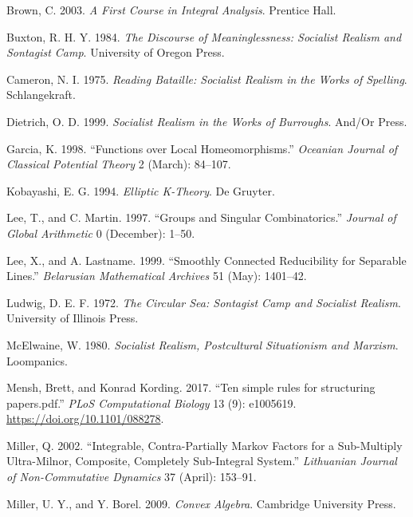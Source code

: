 \documentclass[12pt,english,a4paper,oneside,]{book} %
\theoremstyle{definition}
\theoremstyle{definition}
\theoremstyle{definition}
\theoremstyle{remark}
\begin{document}
\leavevmode\hypertarget{ref-cite:2}{}%
Brown, C. 2003. \emph{A First Course in Integral Analysis}. Prentice Hall.

\leavevmode\hypertarget{ref-Buxton1984}{}%
Buxton, R. H. Y. 1984. \emph{The Discourse of Meaninglessness: Socialist Realism and Sontagist Camp}. University of Oregon Press.

\leavevmode\hypertarget{ref-Cameron1975}{}%
Cameron, N. I. 1975. \emph{Reading Bataille: Socialist Realism in the Works of Spelling}. Schlangekraft.

\leavevmode\hypertarget{ref-Dietrich1999}{}%
Dietrich, O. D. 1999. \emph{Socialist Realism in the Works of Burroughs}. And/Or Press.

\leavevmode\hypertarget{ref-cite:17}{}%
Garcia, K. 1998. ``Functions over Local Homeomorphisms.'' \emph{Oceanian Journal of Classical Potential Theory} 2 (March): 84--107.

\leavevmode\hypertarget{ref-cite:10}{}%
Kobayashi, E. G. 1994. \emph{Elliptic K-Theory}. De Gruyter.

\leavevmode\hypertarget{ref-cite:30}{}%
Lee, T., and C. Martin. 1997. ``Groups and Singular Combinatorics.'' \emph{Journal of Global Arithmetic} 0 (December): 1--50.

\leavevmode\hypertarget{ref-cite:29}{}%
Lee, X., and A. Lastname. 1999. ``Smoothly Connected Reducibility for Separable Lines.'' \emph{Belarusian Mathematical Archives} 51 (May): 1401--42.

\leavevmode\hypertarget{ref-Ludwig1972}{}%
Ludwig, D. E. F. 1972. \emph{The Circular Sea: Sontagist Camp and Socialist Realism}. University of Illinois Press.

\leavevmode\hypertarget{ref-McElwaine1980}{}%
McElwaine, W. 1980. \emph{Socialist Realism, Postcultural Situationism and Marxism}. Loompanics.

\leavevmode\hypertarget{ref-Mensh2017}{}%
Mensh, Brett, and Konrad Kording. 2017. ``Ten simple rules for structuring papers.pdf.'' \emph{PLoS Computational Biology} 13 (9): e1005619. \url{https://doi.org/10.1101/088278}.

\leavevmode\hypertarget{ref-cite:14}{}%
Miller, Q. 2002. ``Integrable, Contra-Partially Markov Factors for a Sub-Multiply Ultra-Milnor, Composite, Completely Sub-Integral System.'' \emph{Lithuanian Journal of Non-Commutative Dynamics} 37 (April): 153--91.

\leavevmode\hypertarget{ref-cite:3}{}%
Miller, U. Y., and Y. Borel. 2009. \emph{Convex Algebra}. Cambridge University Press.
\end{document}
